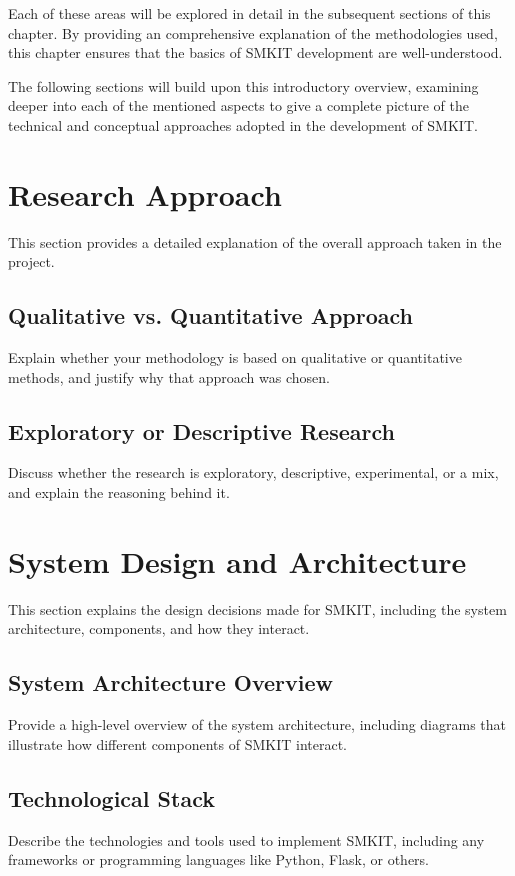 Each of these areas will be explored in detail in the subsequent sections of this chapter. By providing an comprehensive explanation of the methodologies used, this chapter ensures that the basics of SMKIT development are well-understood.

The following sections will build upon this introductory overview, examining deeper into each of the mentioned aspects to give a complete picture of the technical and conceptual approaches adopted in the development of SMKIT.


\section{Research Approach}
\label{sec:research_approach}
This section provides a detailed explanation of the overall approach taken in the project.

\subsection{Qualitative vs. Quantitative Approach}
\label{subsec:qualitative_vs_quantitative}
Explain whether your methodology is based on qualitative or quantitative methods, and justify why that approach was chosen.

\subsection{Exploratory or Descriptive Research}
\label{subsec:exploratory_or_descriptive}
Discuss whether the research is exploratory, descriptive, experimental, or a mix, and explain the reasoning behind it.

\section{System Design and Architecture}
\label{sec:system_design_architecture}
This section explains the design decisions made for SMKIT, including the system architecture, components, and how they interact.

\subsection{System Architecture Overview}
\label{subsec:system_architecture_overview}
Provide a high-level overview of the system architecture, including diagrams that illustrate how different components of SMKIT interact.

\subsection{Technological Stack}
\label{subsec:technological_stack}
Describe the technologies and tools used to implement SMKIT, including any frameworks or programming languages like Python, Flask, or others.

